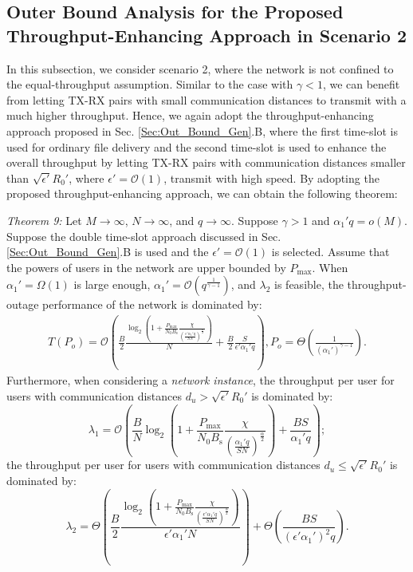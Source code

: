 \documentclass[journal,draftclsnofoot,onecolumn,12pt,twoside]{IEEEtran}
\begin{document}
\subsection{Outer Bound Analysis for the Proposed Throughput-Enhancing Approach in Scenario 2}

In this subsection, we consider scenario 2, where the network is not confined to the equal-throughput assumption. Similar to the case with $\gamma<1$, we can benefit from letting TX-RX pairs with small communication distances to transmit with a much higher throughput. Hence, we again adopt the throughput-enhancing approach proposed in Sec. \ref{Sec:Out_Bound_Gen}.B, where the first time-slot is used for ordinary file delivery and the second time-slot is used to enhance the overall throughput by letting TX-RX pairs with communication distances smaller than $\sqrt{\epsilon'}R_0'$, where $\epsilon'=\mathcal{O}(1)$, transmit with high speed. By adopting the proposed throughput-enhancing approach, we can obtain the following theorem:

{\em Theorem 9:} Let $M\to\infty$, $N\to\infty$, and $q\to\infty$. Suppose $\gamma>1$ and $\alpha_1'q=o(M)$. Suppose the double time-slot approach discussed in Sec. \ref{Sec:Out_Bound_Gen}.B is used and the $\epsilon'=\mathcal{O}(1)$ is selected. Assume that the powers of users in the network are upper bounded by $P_{\text{max}}$. When $\alpha_1'=\Omega(1)$ is large enough, $\alpha_1'=\mathcal{O}\left(q^{\frac{1}{\gamma-1}}\right)$, and $\lambda_2$ is feasible, the throughput-outage performance of the network is dominated by:
\begin{equation}
\begin{aligned}\label{eq:g_model_TC_Anal_Final_C2_gg1}
T(P_o)=\mathcal{O}\left(\frac{B}{2}\frac{\log_2\left(1+\frac{P_{\text{max}}}{N_0B_{\text{s}}}\frac{\chi}{\left(\frac{\epsilon'\alpha_1'q}{SN}\right)^\frac{\alpha}{2}}\right)}{N}+\frac{B}{2}\frac{S}{\epsilon'\alpha_1'q}\right),P_o= \Theta\left(\frac{1}{(\alpha_1')^{\gamma-1}}\right).
\end{aligned}
\end{equation}
Furthermore, when considering a {\em network instance}, the throughput per user for users with communication distances $d_u>\sqrt{\epsilon'}R_0'$ is dominated by:
\begin{equation}
\lambda_1=\mathcal{O}\left(\frac{B}{N}\log_2\left(1+\frac{P_{\text{max}}}{N_0B_{\text{s}}}\frac{\chi}{\left(\frac{\alpha_1'q}{SN}\right)^\frac{\alpha}{2}}\right)+\frac{BS}{\alpha_1'q}\right);
\end{equation}
the throughput per user for users with communication distances $d_u\leq\sqrt{\epsilon'}R_0'$ is dominated by:
\begin{equation}
\lambda_2=\Theta\left(\frac{B}{2}\frac{\log_2\left(1+\frac{P_{\text{max}}}{N_0B_{\text{s}}}\frac{\chi}{\left(\frac{\epsilon'\alpha_1'q}{SN}\right)^\frac{\alpha}{2}}\right)}{\epsilon'\alpha_1'N}\right)+\Theta\left(\frac{BS}{(\epsilon'\alpha_1')^2q}\right).
\end{equation}
\end{document}
